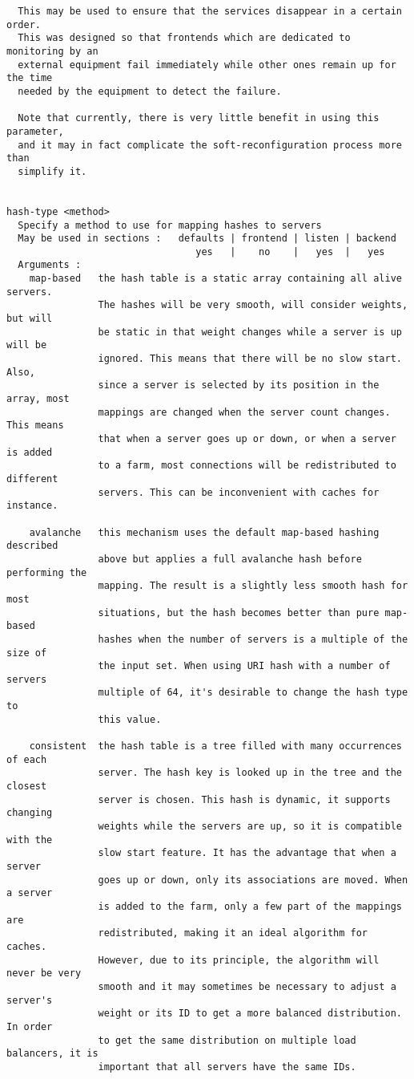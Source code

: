 \begin{verbatim}
  This may be used to ensure that the services disappear in a certain order.
  This was designed so that frontends which are dedicated to monitoring by an
  external equipment fail immediately while other ones remain up for the time
  needed by the equipment to detect the failure.

  Note that currently, there is very little benefit in using this parameter,
  and it may in fact complicate the soft-reconfiguration process more than
  simplify it.


hash-type <method>
  Specify a method to use for mapping hashes to servers
  May be used in sections :   defaults | frontend | listen | backend
                                 yes   |    no    |   yes  |   yes
  Arguments :
    map-based   the hash table is a static array containing all alive servers.
                The hashes will be very smooth, will consider weights, but will
                be static in that weight changes while a server is up will be
                ignored. This means that there will be no slow start. Also,
                since a server is selected by its position in the array, most
                mappings are changed when the server count changes. This means
                that when a server goes up or down, or when a server is added
                to a farm, most connections will be redistributed to different
                servers. This can be inconvenient with caches for instance.

    avalanche   this mechanism uses the default map-based hashing described
                above but applies a full avalanche hash before performing the
                mapping. The result is a slightly less smooth hash for most
                situations, but the hash becomes better than pure map-based
                hashes when the number of servers is a multiple of the size of
                the input set. When using URI hash with a number of servers
                multiple of 64, it's desirable to change the hash type to
                this value.

    consistent  the hash table is a tree filled with many occurrences of each
                server. The hash key is looked up in the tree and the closest
                server is chosen. This hash is dynamic, it supports changing
                weights while the servers are up, so it is compatible with the
                slow start feature. It has the advantage that when a server
                goes up or down, only its associations are moved. When a server
                is added to the farm, only a few part of the mappings are
                redistributed, making it an ideal algorithm for caches.
                However, due to its principle, the algorithm will never be very
                smooth and it may sometimes be necessary to adjust a server's
                weight or its ID to get a more balanced distribution. In order
                to get the same distribution on multiple load balancers, it is
                important that all servers have the same IDs.


\end{verbatim}

